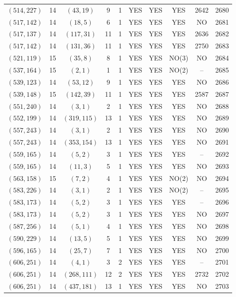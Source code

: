 \begin{longtable}{|c|c|c|c|c|c|c|c|c|c|}
$(514, 227)$ & 14 & $(43, 19)$ & 9 & 1 & YES & YES & YES & 2642 & 2680\\
$(517, 142)$ & 14 & $(18, 5)$ & 6 & 1 & YES & YES & YES & NO & 2681\\
$(517, 137)$ & 14 & $(117, 31)$ & 11 & 1 & YES & YES & YES & 2636 & 2682\\
$(517, 142)$ & 14 & $(131, 36)$ & 11 & 1 & YES & YES & YES & 2750 & 2683\\
$(521, 119)$ & 15 & $(35, 8)$ & 8 & 1 & YES & YES & NO(3) & NO & 2684\\
$(537, 164)$ & 15 & $(2, 1)$ & 1 & 1 & YES & YES & NO(2) & -- & 2685\\
$(539, 123)$ & 14 & $(53, 12)$ & 9 & 1 & YES & YES & YES & NO & 2686\\
$(539, 148)$ & 15 & $(142, 39)$ & 11 & 1 & YES & YES & YES & 2587 & 2687\\
$(551, 240)$ & 14 & $(3, 1)$ & 2 & 1 & YES & YES & YES & NO & 2688\\
$(552, 199)$ & 14 & $(319, 115)$ & 13 & 1 & YES & YES & YES & NO & 2689\\
$(557, 243)$ & 14 & $(3, 1)$ & 2 & 1 & YES & YES & YES & NO & 2690\\
$(557, 243)$ & 14 & $(353, 154)$ & 13 & 1 & YES & YES & YES & NO & 2691\\
$(559, 165)$ & 14 & $(5, 2)$ & 3 & 1 & YES & YES & YES & -- & 2692\\
$(559, 165)$ & 14 & $(11, 3)$ & 5 & 1 & YES & YES & YES & NO & 2693\\
$(563, 158)$ & 15 & $(7, 2)$ & 4 & 1 & YES & YES & NO(2) & NO & 2694\\
$(583, 226)$ & 14 & $(3, 1)$ & 2 & 1 & YES & YES & NO(2) & -- & 2695\\
$(583, 173)$ & 14 & $(5, 2)$ & 3 & 1 & YES & YES & YES & -- & 2696\\
$(583, 173)$ & 14 & $(5, 2)$ & 3 & 1 & YES & YES & YES & NO & 2697\\
$(587, 256)$ & 14 & $(5, 1)$ & 4 & 1 & YES & YES & YES & NO & 2698\\
$(590, 229)$ & 14 & $(13, 5)$ & 5 & 1 & YES & YES & YES & NO & 2699\\
$(596, 165)$ & 14 & $(25, 7)$ & 7 & 1 & YES & YES & YES & NO & 2700\\
$(606, 251)$ & 14 & $(4, 1)$ & 3 & 2 & YES & YES & YES & -- & 2701\\
$(606, 251)$ & 14 & $(268, 111)$ & 12 & 2 & YES & YES & YES & 2732 & 2702\\
$(606, 251)$ & 14 & $(437, 181)$ & 13 & 1 & YES & YES & YES & NO & 2703\\

\end{longtable}
